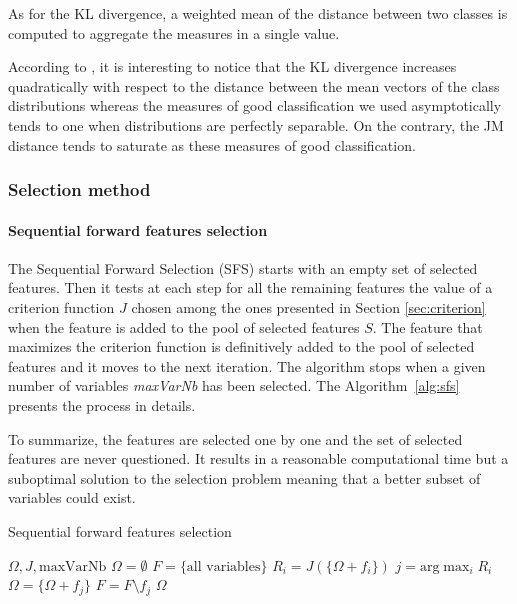 \documentclass[a4paper,11pt,DIV=16,abstracton]{scrartcl}
\begin{document}
            As for the KL divergence, a weighted mean of the distance between two classes is computed to aggregate the measures in a single value.

            \vspace{10 mm}

            According to \cite{bruzzone2009novel}, it is interesting to notice that the KL divergence increases quadratically with respect to the distance between the mean vectors of the class distributions whereas the measures of good classification we used asymptotically tends to one when distributions are perfectly separable. On the contrary, the JM distance tends to saturate as these measures of good classification.


        \subsubsection{Selection method}

            \paragraph{Sequential forward features selection}
            \label{sec:forward-presentation}

            The Sequential Forward Selection (SFS) starts with an empty set of selected features. Then it tests at each step for all the remaining features the value of a criterion function $J$ chosen among the ones presented in Section \ref{sec:criterion} when the feature is added to the pool of selected features $S$. The feature that maximizes the criterion function is definitively added to the pool of selected features and it moves to the next iteration. The algorithm stops when a given number of variables \emph{maxVarNb} has been selected. The Algorithm~\ref{alg:sfs} presents the process in details.

            To summarize, the features are selected one by one and the set of selected features are never questioned. It results in a reasonable computational time but a suboptimal solution to the selection problem meaning that a better subset of variables could exist.

            \begin{algorithm}
            \caption{Sequential forward features selection\label{alg:sfs}}
            {\fontsize{10}{10}\selectfont
            \begin{algorithmic}[1]
            \REQUIRE $\Omega,J,\text{maxVarNb}$
            \STATE $\Omega=\emptyset$
            \STATE $F=\text{\{all variables\}}$
            \STATE $R_i = J(\{\Omega + f_i\})$
            \ENDFOR
            \STATE $j=\text{arg} \max_{i} R_i$
            \STATE $\Omega = \{\Omega + f_j\}$
            \STATE $F = F \setminus f_j$
            \ENDWHILE
            \RETURN $\Omega$
            \end{algorithmic}
            }
            \end{algorithm}
\end{document}
